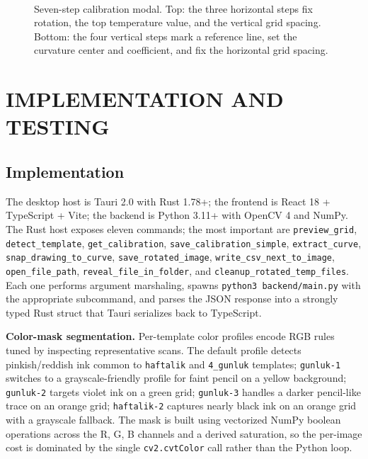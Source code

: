 \documentclass[a4paper,12pt]{report}
\begin{document}
\begin{figure}[h!]
\centering
{}\\[6pt]
\caption{Seven-step calibration modal. Top: the three horizontal steps fix rotation, the top temperature value, and the vertical grid spacing. Bottom: the four vertical steps mark a reference line, set the curvature center and coefficient, and fix the horizontal grid spacing.}
\label{fig:ui-calibrate}
\end{figure}

\chapter{IMPLEMENTATION AND TESTING}
\section{Implementation}

The desktop host is Tauri 2.0 with Rust 1.78+; the frontend is React 18 + TypeScript + Vite; the backend is Python 3.11+ with OpenCV 4 and NumPy. The Rust host exposes eleven commands; the most important are \texttt{preview\_grid}, \texttt{detect\_template}, \texttt{get\_calibration}, \texttt{save\_calibration\_simple}, \texttt{extract\_curve}, \texttt{snap\_drawing\_to\_curve}, \texttt{save\_rotated\_image}, \texttt{write\_csv\_next\_to\_image}, \texttt{open\_file\_path}, \texttt{reveal\_file\_in\_folder}, and \texttt{cleanup\_rotated\_temp\_files}. Each one performs argument marshaling, spawns \texttt{python3 backend/main.py} with the appropriate subcommand, and parses the JSON response into a strongly typed Rust struct that Tauri serializes back to TypeScript.

\textbf{Color-mask segmentation.} Per-template color profiles encode RGB rules tuned by inspecting representative scans. The default profile detects pinkish/reddish ink common to \texttt{haftalik} and \texttt{4\_gunluk} templates; \texttt{gunluk-1} switches to a grayscale-friendly profile for faint pencil on a yellow background; \texttt{gunluk-2} targets violet ink on a green grid; \texttt{gunluk-3} handles a darker pencil-like trace on an orange grid; \texttt{haftalik-2} captures nearly black ink on an orange grid with a grayscale fallback. The mask is built using vectorized NumPy boolean operations across the R, G, B channels and a derived saturation, so the per-image cost is dominated by the single \texttt{cv2.cvtColor} call rather than the Python loop.
\end{document}
